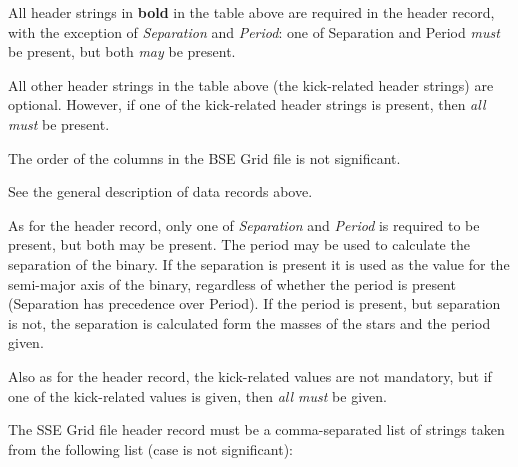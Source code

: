 \newpage
All header strings in\textbf{ bold} in the table above are required in the header record, with the exception of \textit{Separation} and \textit{Period}: one of Separation and Period \textit{must} be present, but both \textit{may} be present.

All other header strings in the table above (the kick-related header strings) are optional.  However, if one of the kick-related header strings is present, then \textit{all must} be present.

The order of the columns in the BSE Grid file is not significant.  


See the general description of data records above.  

As for the header record, only one of \textit{Separation} and \textit{Period} is required to be present, but both may be present. The period may be used to calculate the separation of the binary. If the separation is present it is used as the value for the semi-major axis of the binary, regardless of whether the period is present (Separation has precedence over Period). If the period is present, but separation is not, the separation is calculated form the masses of the stars and the period given.

Also as for the header record, the kick-related values are not mandatory, but if one of the kick-related values is given, then \textit{all must} be given.


The SSE Grid file header record must be a comma-separated list of strings taken from the following list (case is not significant):

